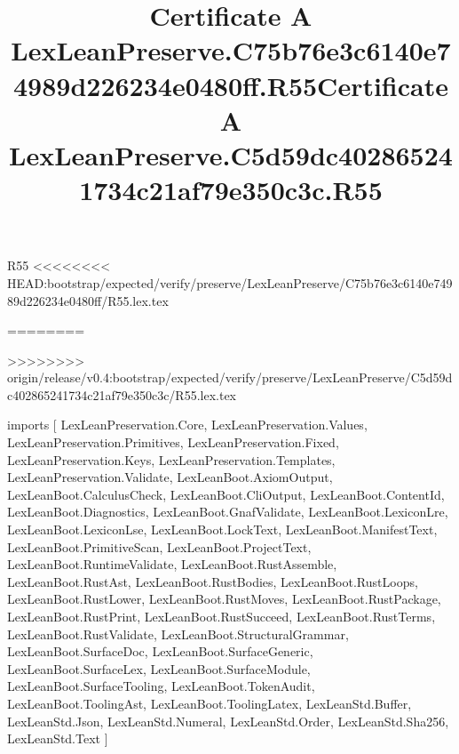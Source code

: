 \begin{lexlean}{R55}
<<<<<<<< HEAD:bootstrap/expected/verify/preserve/LexLeanPreserve/C75b76e3c6140e74989d226234e0480ff/R55.lex.tex
\title{Certificate A LexLeanPreserve.C75b76e3c6140e74989d226234e0480ff.R55}
========
\title{Certificate A LexLeanPreserve.C5d59dc402865241734c21af79e350c3c.R55}
>>>>>>>> origin/release/v0.4:bootstrap/expected/verify/preserve/LexLeanPreserve/C5d59dc402865241734c21af79e350c3c/R55.lex.tex
\begin{coremodule}
imports [
  LexLeanPreservation.Core,
  LexLeanPreservation.Values,
  LexLeanPreservation.Primitives,
  LexLeanPreservation.Fixed,
  LexLeanPreservation.Keys,
  LexLeanPreservation.Templates,
  LexLeanPreservation.Validate,
  LexLeanBoot.AxiomOutput,
  LexLeanBoot.CalculusCheck,
  LexLeanBoot.CliOutput,
  LexLeanBoot.ContentId,
  LexLeanBoot.Diagnostics,
  LexLeanBoot.GnafValidate,
  LexLeanBoot.LexiconLre,
  LexLeanBoot.LexiconLse,
  LexLeanBoot.LockText,
  LexLeanBoot.ManifestText,
  LexLeanBoot.PrimitiveScan,
  LexLeanBoot.ProjectText,
  LexLeanBoot.RuntimeValidate,
  LexLeanBoot.RustAssemble,
  LexLeanBoot.RustAst,
  LexLeanBoot.RustBodies,
  LexLeanBoot.RustLoops,
  LexLeanBoot.RustLower,
  LexLeanBoot.RustMoves,
  LexLeanBoot.RustPackage,
  LexLeanBoot.RustPrint,
  LexLeanBoot.RustSucceed,
  LexLeanBoot.RustTerms,
  LexLeanBoot.RustValidate,
  LexLeanBoot.StructuralGrammar,
  LexLeanBoot.SurfaceDoc,
  LexLeanBoot.SurfaceGeneric,
  LexLeanBoot.SurfaceLex,
  LexLeanBoot.SurfaceModule,
  LexLeanBoot.SurfaceTooling,
  LexLeanBoot.TokenAudit,
  LexLeanBoot.ToolingAst,
  LexLeanBoot.ToolingLatex,
  LexLeanStd.Buffer,
  LexLeanStd.Json,
  LexLeanStd.Numeral,
  LexLeanStd.Order,
  LexLeanStd.Sha256,
  LexLeanStd.Text
]


\end{coremodule}
\end{lexlean}
